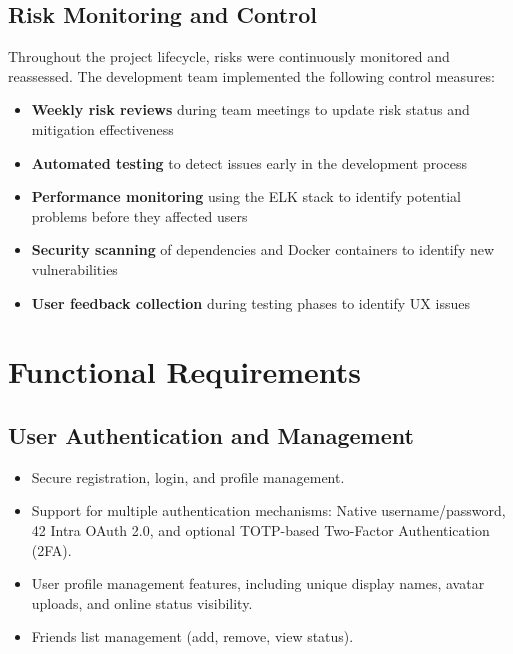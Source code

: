 \subsection{Risk Monitoring and Control}
Throughout the project lifecycle, risks were continuously monitored and reassessed. The development team implemented the following control measures:

\begin{itemize}
    \item \textbf{Weekly risk reviews} during team meetings to update risk status and mitigation effectiveness
    \item \textbf{Automated testing} to detect issues early in the development process
    \item \textbf{Performance monitoring} using the ELK stack to identify potential problems before they affected users
    \item \textbf{Security scanning} of dependencies and Docker containers to identify new vulnerabilities
    \item \textbf{User feedback collection} during testing phases to identify UX issues
\end{itemize}

\section{Functional Requirements}
\subsection*{User Authentication and Management}
\begin{itemize}
    \item Secure registration, login, and profile management.
    \item Support for multiple authentication mechanisms: Native username/password, 42 Intra OAuth 2.0, and optional TOTP-based Two-Factor Authentication (2FA).
    \item User profile management features, including unique display names, avatar uploads, and online status visibility.
    \item Friends list management (add, remove, view status).
\end{itemize}


